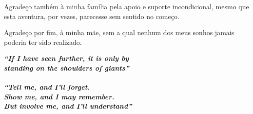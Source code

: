 \documentclass[
	12pt,				%
	openright,			%
	oneside,			%
	a4paper,			%
	english,			%
	french,				%
	spanish,			%
	brazil,				%
	]{abntex2}
\begin{document}

	\begin{agradecimentos}


	Agradeço também à minha família pela apoio e suporte incondicional, mesmo que esta aventura, por vezes, parecesse sem sentido no começo. 

	Agradeço por fim, à minha mãe, sem a  qual nenhum dos meus sonhos jamais poderia ter sido realizado.




	\end{agradecimentos}


	\cleardoublepage
	\begin{epigrafe}
	    \vspace*{\fill}
		\begin{flushright}
			\Large{\textbf{\textit{ ``If I have seen further, it is only by \\
			    		    	         	  standing on the shoulders of giants''}}} \\
			    	    	         		 \textbf{} \\
			\vspace{1cm}    	    	         		 
			\Large{\textbf{\textit{``Tell me, and I’ll forget. \\
								   Show me, and I may remember. \\
								   But involve me, and I’ll understand''}}} \\
			 								\textbf{}

		\end{flushright}
	\end{epigrafe}

	\cleardoublepage
\end{document}
